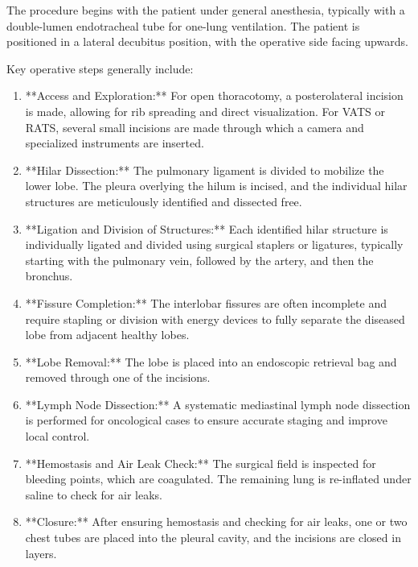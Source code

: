 The procedure begins with the patient under general anesthesia, typically with a double-lumen endotracheal tube for one-lung ventilation. The patient is positioned in a lateral decubitus position, with the operative side facing upwards.

Key operative steps generally include:

\begin{enumerate}
  \item **Access and Exploration:** For open thoracotomy, a posterolateral incision is made, allowing for rib spreading and direct visualization. For VATS or RATS, several small incisions are made through which a camera and specialized instruments are inserted.
  
  \item **Hilar Dissection:** The pulmonary ligament is divided to mobilize the lower lobe. The pleura overlying the hilum is incised, and the individual hilar structures are meticulously identified and dissected free.
  
  \item **Ligation and Division of Structures:** Each identified hilar structure is individually ligated and divided using surgical staplers or ligatures, typically starting with the pulmonary vein, followed by the artery, and then the bronchus.
  
  \item **Fissure Completion:** The interlobar fissures are often incomplete and require stapling or division with energy devices to fully separate the diseased lobe from adjacent healthy lobes.
  
  \item **Lobe Removal:** The lobe is placed into an endoscopic retrieval bag and removed through one of the incisions.
  
  \item **Lymph Node Dissection:** A systematic mediastinal lymph node dissection is performed for oncological cases to ensure accurate staging and improve local control.
  
  \item **Hemostasis and Air Leak Check:** The surgical field is inspected for bleeding points, which are coagulated. The remaining lung is re-inflated under saline to check for air leaks.
  
  \item **Closure:** After ensuring hemostasis and checking for air leaks, one or two chest tubes are placed into the pleural cavity, and the incisions are closed in layers.
\end{enumerate}

